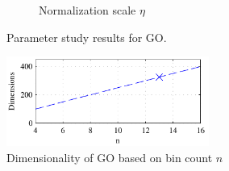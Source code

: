 \documentclass[thesis.tex]{subfiles}
\begin{document}
\begin{figure}[p]
{\begin{subfigure}[t]{0.593\textwidth}
		\caption{Normalization scale $\eta$}
		\label{fig:dtuParametersGo_normSigma}
		\vspace{2mm}
	\end{subfigure}}
	\caption{Parameter study results for GO.}
	\label{fig:dtuParametersGoAuc}
	\vspace{1cm}
	\includegraphics[width=0.593\textwidth]{img/dtuParametersGo_binCountDims.pdf}
	\caption{Dimensionality of GO based on bin count $n$}
	\label{fig:dtuParametersGoDims}
\end{figure}
%
\end{document}
